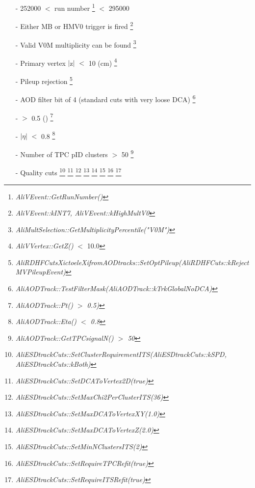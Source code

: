 \begin{itemize}
    \small
    \item []  \vspace{1pt}
    \item[-] 252000 $<$ run number
     \footnote{\textit{AliVEvent::GetRunNumber()}} $<$ 295000
     \item[-] Either MB or HMV0 trigger is fired
     \footnote{\textit{AliVEvent::kINT7, AliVEvent::kHighMultV0}}
     \item[-] Valid V0M multiplicity can be found
     \footnote{\textit{AliMultSelection::GetMultiplicityPercentile("V0M")}}
    \item[-] Primary vertex $|$z$|$ $<$ 10 (cm)
     \footnote{\textit{AliVVertex::GetZ()} $<$ 10.0}
    \item[-] Pileup rejection
     \footnote{\textit{AliRDHFCutsXictoeleXifromAODtracks::SetOptPileup(AliRDHFCuts::kRejectMVPileupEvent)}}
\end{itemize}
%
\begin{itemize}
    \small
    \item[]  \vspace{1pt}
    \item[-] AOD filter bit of 4 (standard cuts with very loose DCA)
    \footnote{\textit{AliAODTrack::TestFilterMask(AliAODTrack::kTrkGlobalNoDCA)}}
    \item[-] \pt $>$ 0.5 (\GeVc) \footnote{\textit{AliAODTrack::Pt() $>$ 0.5)}}
    \item[-] $|\eta|$ $<$ 0.8 \footnote{\textit{AliAODTrack::Eta() $<$ 0.8}}
    \item[-] Number of TPC pID clusters $>$ 50
    \footnote{\textit{AliAODTrack::GetTPCsignalN() $>$ 50}}
    \item[-] Quality cuts
    \footnote{\textit{AliESDtrackCuts::SetClusterRequirementITS(AliESDtrackCuts::kSPD, AliESDtrackCuts::kBoth)}}
    \footnote{\textit{AliESDtrackCuts::SetDCAToVertex2D(true)}}
    \footnote{\textit{AliESDtrackCuts::SetMaxChi2PerClusterITS(36)}}
    \footnote{\textit{AliESDtrackCuts::SetMaxDCAToVertexXY(1.0)}}
    \footnote{\textit{AliESDtrackCuts::SetMaxDCAToVertexZ(2.0)}}
    \footnote{\textit{AliESDtrackCuts::SetMinNClustersITS(2)}}
    \footnote{\textit{AliESDtrackCuts::SetRequireTPCRefit(true)}}
    \footnote{\textit{AliESDtrackCuts::SetRequireITSRefit(true)}}
\end{itemize}
